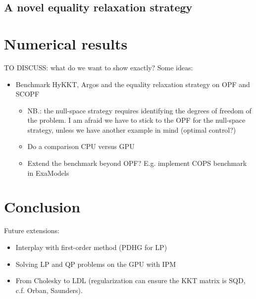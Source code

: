 \documentclass{article}
\theoremstyle{definition}
\theoremstyle{remark}
\begin{document}
\subsection{A novel equality relaxation strategy}



\section{Numerical results}
TO DISCUSS: what do we want to show exactly? Some ideas:
\begin{itemize}
  \item Benchmark HyKKT, Argos and the equality relaxation strategy
    on OPF and SCOPF
    \begin{itemize}
      \item NB.: the null-space strategy requires identifying
        the degrees of freedom of the problem. I am afraid
        we have to stick to the OPF for the null-space strategy,
        unless we have another example in mind (optimal control?)
      \item Do a comparison CPU versus GPU
      \item Extend the benchmark beyond OPF? E.g. implement
        COPS benchmark in ExaModels
    \end{itemize}
\end{itemize}

\section{Conclusion}
Future extensions:
\begin{itemize}
  \item Interplay with first-order method (PDHG for LP)
  \item Solving LP and QP problems on the GPU with IPM
  \item From Cholesky to LDL (regularization can
    ensure the KKT matrix is SQD, c.f. Orban, Saunders).
\end{itemize}



\end{document}
